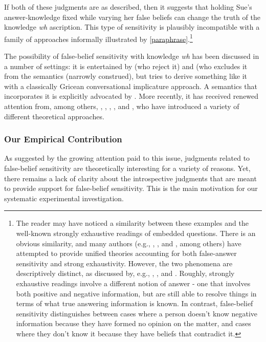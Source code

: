 \documentclass[a4paper]{article}
\begin{document}
If both of these judgments are as described, then it suggests that holding Sue's answer-knowledge fixed while varying her false beliefs can change the truth of the knowledge \textit{wh} ascription. This type of sensitivity is plausibly incompatible with a family of approaches informally illustrated by \ref{paraphrase}.\footnote{The reader may have noticed a similarity between these examples and the well-known strongly exhaustive readings of embedded questions. There is an obvious similarity, and many authors (e.g., \citet{kr:11}, \citet{cremers:plurality}, and \citet{theiler:etal}, among others) have attempted to provide unified theories accounting for both false-answer sensitivity and strong exhaustivity. However, the two phenomena are descriptively distinct, as discussed by, e.g., \citet{george:dis}, \citet{cremerschemla:2014}, and \citet{theiler:etal}. Roughly, strongly exhaustive readings involve a different notion of answer - one that involves both positive and negative information, but are still able to resolve things in terms of what true answering information is known. In contrast, false-belief sensitivity distinguishes between cases where a person doesn't know negative information because they have formed no opinion on the matter, and cases where they don't know it because they have beliefs that contradict it.}

The possibility of false-belief sensitivity with knowledge \textit{wh} has been discussed in a number of settings: it is entertained by \citet{gs:82} (who reject it) and \citet{berman} (who excludes it from the semantics (narrowly construed), but tries to derive something like it with a classically Gricean conversational implicature approach. A semantics that incorporates it is explicitly advocated by \citet{spector:05}. More recently, it has received renewed attention from, among others, \citet{kr:11}, \citet{george:dis, george:thought}, \citet{cremerschemla:2014}, \citet{cremers:plurality}, \citet{theiler:etal} and \citet{xiang:sub:16}, who have introduced a variety of different theoretical approaches.

\subsubsection{Our Empirical Contribution} 

As suggested by the growing attention paid to this issue, judgments related to false-belief sensitivity are theoretically interesting for a variety of reasons. Yet, there remains a lack of clarity about the introspective judgments that are meant to provide support for false-belief sensitivity. This is the main motivation for our systematic experimental investigation.
\end{document}

